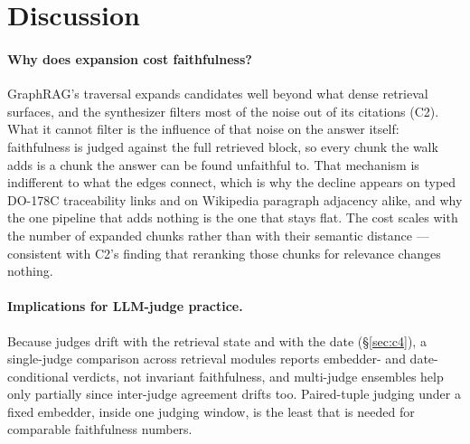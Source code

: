 \section{Discussion}
\label{sec:discussion}

\paragraph{Why does expansion cost faithfulness?}
GraphRAG's traversal expands candidates well beyond what dense
retrieval surfaces, and the synthesizer filters most of the noise out
of its citations (C2). What it cannot filter is the influence of that
noise on the answer itself: faithfulness is judged against the full
retrieved block, so every chunk the walk adds is a chunk the answer can
be found unfaithful to. That mechanism is indifferent to what the edges
connect, which is why the decline appears on typed DO-178C traceability
links and on Wikipedia paragraph adjacency alike, and why the one
pipeline that adds nothing is the one that stays flat. The cost scales
with the number of expanded chunks rather than with their semantic
distance --- consistent with C2's finding that reranking those chunks
for relevance changes nothing.

\paragraph{Implications for LLM-judge practice.}
Because judges drift with the retrieval state and with the date
(\S\ref{sec:c4}), a single-judge comparison across retrieval modules
reports embedder- and date-conditional verdicts, not invariant
faithfulness, and multi-judge ensembles help only partially since
inter-judge agreement drifts too. Paired-tuple judging under a fixed
embedder, inside one judging window, is the least that is needed for
comparable faithfulness numbers.

